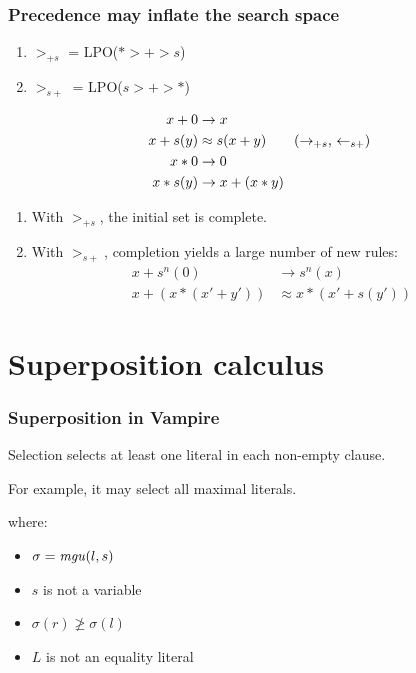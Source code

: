 \documentclass[a4paper]{beamer}
\begin{document}
\begin{frame}
\frametitle{Precedence may inflate the search space}
\begin{enumerate}
\item $>_{+s}$ = LPO($* > + > s$)
\item $>_{s+}$ = LPO($s > + > *$)
\end{enumerate}
\begin{align*}
x + 0 &\to x \\
x + s(y) &\approx s(x + y) \tag{$\to_{+s}$, $\leftarrow_{s+}$}\\
x * 0 &\to 0\\
x * s(y) &\to x + (x * y)
\end{align*}
\begin{enumerate}
\item With $>_{+s}$, the initial set is complete.
\item With $>_{s+}$, completion yields a large number of new rules:
\begin{align*}
x + s^n(0) &\to s^n(x) \tag{$\forall n \in \nat$}\\
x + (x * (x' + y')) &\approx x * (x' + s(y')) \tag{unorientable}
\end{align*}
\end{enumerate}
\end{frame}

\section{Superposition calculus}

\begin{frame}
\frametitle{Superposition in Vampire}
Selection selects at least one literal in each non-empty clause.

For example, it may select all maximal literals.


where:

\begin{itemize}
\item $\sigma = \mathit{mgu}(l, s)$
\item $s$ is not a variable
\item $\sigma(r) \ngeq \sigma(l)$
\item $L$ is not an equality literal
\end{itemize}
\end{frame}
\end{document}
